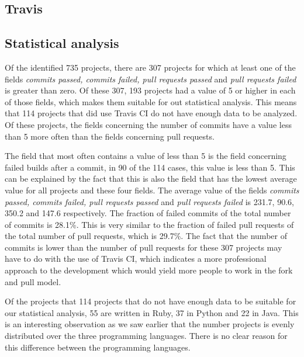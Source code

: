 \subsection{Travis}


\subsection{Statistical analysis}
Of the identified 735 projects, there are 307 projects for which at least one of the fields \textit{commits passed, commits failed, pull requests passed} and \textit{pull requests failed} is greater than zero.
Of these 307, 193 projects had a value of 5 or higher in each of those fields, which makes them suitable for out statistical analysis.
This means that 114 projects that did use Travis CI do not have enough data to be analyzed. 
Of these projects, the fields concerning the number of commits have a value less than 5 more often than the fields concerning pull requests.

The field that most often contains a value of less than 5 is the field concerning failed builds after a commit, in 90 of the 114 cases, this value is less than 5.
This can be explained by the fact that this is also the field that has the lowest average value for all projects and these four fields. 
The average value of the fields \textit{commits passed, commits failed, pull requests passed} and \textit{pull requests failed} is 231.7, 90.6, 350.2 and 147.6 respectively.
The fraction of failed commits of the total number of commits is 28.1\%. This is very similar to the fraction of failed pull requests of the total number of pull requests, which is 29.7\%.
The fact that the number of commits is lower than the number of pull requests for these 307 projects may have to do with the use of Travis CI, which indicates a more professional approach to the development which would yield more people to work in the fork and pull model.

Of the projects that 114 projects that do not have enough data to be suitable for our statistical analysis, 55 are written in Ruby, 37 in Python and 22 in Java.
This is an interesting observation as we saw earlier that the number projects is evenly distributed over the three programming languages.
There is no clear reason for this difference between the programming languages.

